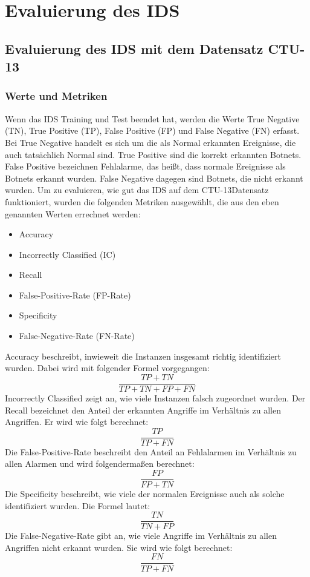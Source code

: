 \documentclass[main.tex]{subfiles}
\begin{document}
\section{Evaluierung des IDS}
\subsection{Evaluierung des IDS mit dem Datensatz CTU-13}

\subsubsection{Werte und Metriken}
Wenn das IDS Training und Test beendet hat, werden die Werte True Negative (TN), True Positive (TP), False Positive (FP) und False Negative (FN) erfasst. Bei True Negative handelt es sich um die als Normal erkannten Ereignisse, die auch tatsächlich Normal sind. True Positive sind die korrekt erkannten Botnets. False Positive bezeichnen Fehlalarme, das heißt, dass normale Ereignisse als Botnets erkannt wurden. False Negative dagegen sind Botnets, die nicht erkannt wurden. 
Um zu evaluieren, wie gut das IDS auf dem CTU-13Datensatz funktioniert, wurden die folgenden Metriken ausgewählt, die aus den eben genannten Werten errechnet werden:

\begin{itemize}
\item Accuracy
\item Incorrectly Classified (IC)
\item Recall
\item False-Positive-Rate (FP-Rate)
\item Specificity
\item False-Negative-Rate (FN-Rate)
\end{itemize}

Accuracy beschreibt, inwieweit die Instanzen insgesamt richtig identifiziert wurden. Dabei wird mit folgender Formel vorgegangen:
\begin{equation}
\frac{TP + TN}{TP + TN + FP + FN}
\end{equation}
Incorrectly Classified zeigt an, wie viele Instanzen falsch zugeordnet wurden.
Der Recall bezeichnet den Anteil der erkannten Angriffe im Verhältnis zu allen Angriffen. Er wird wie folgt berechnet:
\begin{equation}
\frac{TP}{TP +  FN}
\end{equation}
Die False-Positive-Rate beschreibt den Anteil an Fehlalarmen im Verhältnis zu allen Alarmen und wird folgendermaßen berechnet:
\begin{equation}
\frac{FP}{FP + TN}
\end{equation}
Die Specificity beschreibt, wie viele der normalen Ereignisse auch als solche identifiziert wurden. Die Formel lautet:
\begin{equation}
\frac{TN}{TN + FP}
\end{equation}
Die False-Negative-Rate gibt an, wie viele Angriffe im Verhältnis zu allen Angriffen nicht erkannt wurden. Sie wird wie folgt berechnet:
\begin{equation}
\frac{FN}{TP + FN}
\end{equation}
\end{document}
